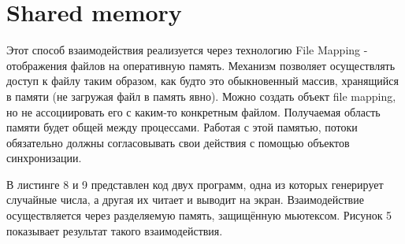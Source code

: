 \documentclass[a4paper,12pt]{article} %
\begin{document}
\newpage
\section*{Shared memory}

Этот способ взаимодействия реализуется через технологию File Mapping - отображения файлов на оперативную память. Механизм позволяет осуществлять доступ к файлу таким образом, как будто это обыкновенный массив, хранящийся в памяти (не загружая файл в память явно). Можно создать объект file mapping, но не ассоциировать его с каким-то конкретным файлом. Получаемая область памяти будет общей между процессами. Работая с этой памятью, потоки обязательно должны согласовывать свои действия с помощью объектов синхронизации.

В листинге 8 и 9 представлен код двух программ, одна из которых генерирует случайные числа, а другая их читает и выводит на экран. Взаимодействие осуществляется через разделяемую память, защищённую мьютексом. Рисунок 5 показывает результат такого взаимодействия.
\end{document}
